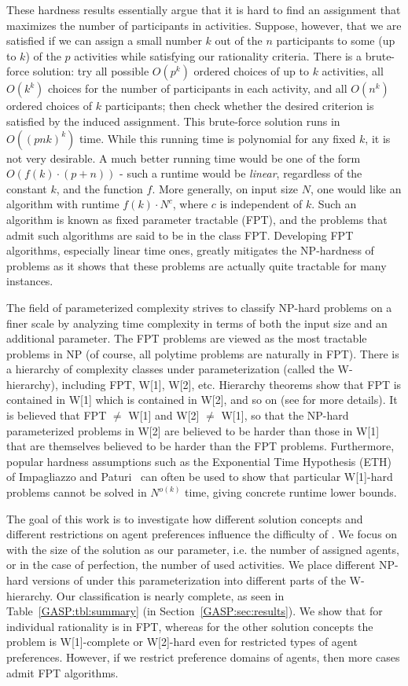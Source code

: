 These hardness results essentially argue that it is hard to find an assignment that maximizes the number of participants in activities. Suppose, however, that we are satisfied if we can assign a small number $k$ out of the $n$ participants to some (up to $k$) of the $p$ activities while satisfying our rationality criteria. There is a brute-force solution: try all possible $O(p^k)$ ordered choices of up to $k$ activities, all $O(k^k)$ choices for the number of participants in each activity, and all $O(n^k)$ ordered choices of $k$ participants; then check whether the desired criterion is satisfied by the induced assignment. This brute-force solution runs in $O((pnk)^k)$ time. While this running time is polynomial for any fixed $k$, it is not very desirable. A much better running time would be one of the form $O(f(k)\cdot (p+n))$ - such a runtime would be {\em linear}, regardless of the constant $k$, and the function $f$. More generally, on input size $N$, one would like an algorithm with runtime $f(k)\cdot N^c$, where $c$ is independent of $k$. Such an algorithm is known as fixed parameter tractable (FPT), and the problems that admit such algorithms are said to be in the class FPT. Developing FPT algorithms, especially linear time ones, greatly mitigates the NP-hardness of problems as it shows that these problems are actually quite tractable for many instances.

The field of parameterized complexity strives to classify NP-hard problems on a finer scale by analyzing time complexity in terms of both the input size and an additional parameter. The FPT problems are viewed as the most tractable problems in NP (of course, all polytime problems are naturally in FPT).
There is a hierarchy of complexity classes under parameterization (called the W-hierarchy), including FPT, W[1], W[2], etc. Hierarchy theorems show that FPT is contained in W[1] which is contained in W[2], and so on (see \cite{downey2012} for more details). It is believed that FPT $\neq$ W[1] and W[2] $\neq$ W[1], so that the NP-hard parameterized problems in W[2] are believed to be harder than those in W[1] that are themselves believed to be harder than the FPT problems. Furthermore, popular hardness assumptions such as the Exponential Time Hypothesis (ETH) of Impagliazzo and Paturi~\cite{impagl} can often be used to show that particular W[1]-hard problems cannot be solved in $N^{o(k)}$ time, giving concrete runtime lower bounds.

The goal of this work is to investigate how different solution concepts and different restrictions on agent preferences influence the difficulty of \GASP.
We focus on \GASPs with the size of the solution as our parameter, i.e. the number of assigned agents, or in the case of perfection, the number of used activities. 
We place different NP-hard versions of \GASPs under this parameterization into different parts of the W-hierarchy.
Our classification is nearly complete, as seen in Table~\ref{GASP:tbl:summary} (in Section~\ref{GASP:sec:results}). We show that \GASPs for individual rationality is in FPT, whereas for the other solution concepts the problem is W[1]-complete or W[2]-hard even for restricted types of agent preferences. However, if we restrict preference domains of agents, then more cases admit FPT algorithms. 

